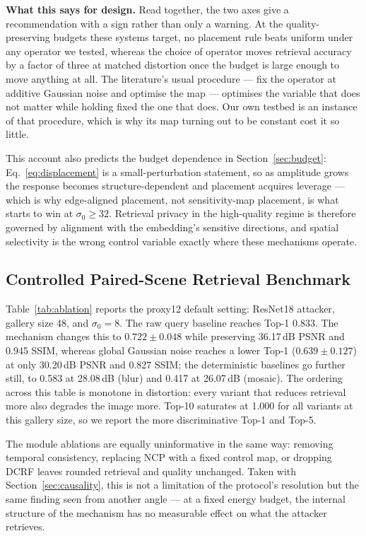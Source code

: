 \documentclass[10pt,journal]{IEEEtran}
\begin{document}
\textbf{What this says for design.} Read together, the two axes give a
recommendation with a sign rather than only a warning. At the quality-preserving
budgets these systems target, no placement rule beats uniform under any
operator we tested, whereas the choice of operator moves retrieval accuracy by
a factor of three at matched distortion once the budget is large enough to move
anything at all. The literature's usual procedure --- fix the operator at
additive Gaussian noise and optimise the map --- optimises the variable that
does not matter while holding fixed the one that does. Our own testbed is an
instance of that procedure, which is why its map turning out to be constant
cost it so little.

This account also predicts the budget dependence in
Section~\ref{sec:budget}: Eq.~\eqref{eq:displacement} is a small-perturbation
statement, so as amplitude grows the response becomes structure-dependent and
placement acquires leverage --- which is why edge-aligned placement, not
sensitivity-map placement, is what starts to win at $\sigma_0 \ge 32$. Retrieval privacy in
the high-quality regime is therefore governed by alignment with the
embedding's sensitive directions, and spatial selectivity is the wrong control
variable exactly where these mechanisms operate.

\subsection{Controlled Paired-Scene Retrieval Benchmark}
Table~\ref{tab:ablation} reports the proxy12 default setting: ResNet18 attacker, gallery size 48, and $\sigma_0=8$. The raw query baseline reaches Top-1 0.833. The mechanism changes this to $0.722\pm0.048$ while preserving 36.17\,dB PSNR and 0.945 SSIM, whereas global Gaussian noise reaches a lower Top-1 ($0.639\pm0.127$) at only 30.20\,dB PSNR and 0.827 SSIM; the deterministic baselines go further still, to 0.583 at 28.08\,dB (blur) and 0.417 at 26.07\,dB (mosaic). The ordering across this table is monotone in distortion: every variant that reduces retrieval more also degrades the image more. Top-10 saturates at 1.000 for all variants at this gallery size, so we report the more discriminative Top-1 and Top-5.

The module ablations are equally uninformative in the same way: removing temporal consistency, replacing NCP with a fixed control map, or dropping DCRF leaves rounded retrieval and quality unchanged. Taken with Section~\ref{sec:causality}, this is not a limitation of the protocol's resolution but the same finding seen from another angle --- at a fixed energy budget, the internal structure of the mechanism has no measurable effect on what the attacker retrieves.
\end{document}
